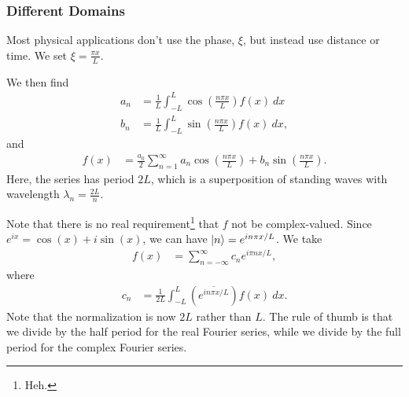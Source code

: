 \documentclass[10pt]{mypackage}
\begin{document}
\subsubsection{Different Domains}%
Most physical applications don't use the phase, $\xi$, but instead use distance or time. We set $\xi = \frac{\pi x}{L}$.\newline

We then find
\begin{align*}
  a_n &= \frac{1}{L}\int_{-L}^{L} \cos\left(\frac{n \pi x}{L}\right)f(x)\:dx\\
  b_n &= \frac{1}{L}\int_{-L}^{L} \sin\left(\frac{n \pi x}{L}\right)f(x)\:dx,
\end{align*}
and
\begin{align*}
  f(x) &= \frac{a_0}{2} \sum_{n=1}^{\infty}a_n\cos\left(\frac{n\pi x}{L}\right) + b_n\sin\left(\frac{n\pi x}{L}\right).
\end{align*}
Here, the series has period $2L$, which is a superposition of standing waves with wavelength $\lambda_n = \frac{2L}{n}$.\newline

Note that there is no real requirement\footnote{Heh.} that $f$ not be complex-valued. Since $e^{ix} = \cos\left(x\right) + i\sin \left(x\right)$, we can have $\ket{n} = e^{in\pi x/L}$. We take
\begin{align*}
  f(x) &= \sum_{n=-\infty}^{\infty}c_ne^{i\pi n x / L},
\end{align*}
where
\begin{align*}
  c_n &= \frac{1}{2L} \int_{-L}^{L} \left(\overline{e^{in\pi x/L}}\right)f(x)\:dx.
\end{align*}
Note that the normalization is now $2L$ rather than $L$. The rule of thumb is that we divide by the half period for the real Fourier series, while we divide by the full period for the complex Fourier series.\newline
\end{document}
